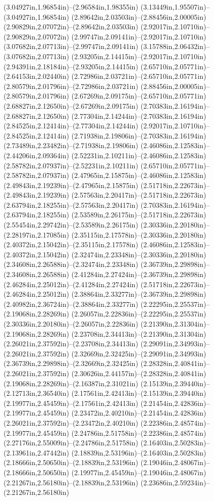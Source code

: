 (3.04927in,1.96854in)--(2.96584in,1.98355in) (3.13449in,1.95507in)--(3.04927in,1.96854in) (2.89642in,2.03503in)--(2.88456in,2.00005in) (2.90829in,2.07072in)--(2.89642in,2.03503in) (2.92017in,2.10710in)--(2.90829in,2.07072in) (2.99747in,2.09141in)--(2.92017in,2.10710in) (3.07682in,2.07713in)--(2.99747in,2.09141in) (3.15788in,2.06432in)--(3.07682in,2.07713in) (2.93205in,2.14415in)--(2.92017in,2.10710in) (2.94391in,2.18184in)--(2.93205in,2.14415in) (2.65710in,2.05771in)--(2.64153in,2.02440in) (2.72986in,2.03721in)--(2.65710in,2.05771in) (2.80579in,2.01796in)--(2.72986in,2.03721in) (2.88456in,2.00005in)--(2.80579in,2.01796in) (2.67269in,2.09175in)--(2.65710in,2.05771in) (2.68827in,2.12650in)--(2.67269in,2.09175in) (2.70383in,2.16194in)--(2.68827in,2.12650in) (2.77304in,2.14244in)--(2.70383in,2.16194in) (2.84525in,2.12414in)--(2.77304in,2.14244in) (2.92017in,2.10710in)--(2.84525in,2.12414in) (2.71938in,2.19806in)--(2.70383in,2.16194in) (2.73489in,2.23482in)--(2.71938in,2.19806in) (2.46086in,2.12583in)--(2.44206in,2.09364in) (2.52231in,2.10211in)--(2.46086in,2.12583in) (2.58782in,2.07937in)--(2.52231in,2.10211in) (2.65710in,2.05771in)--(2.58782in,2.07937in) (2.47965in,2.15875in)--(2.46086in,2.12583in) (2.49843in,2.19239in)--(2.47965in,2.15875in) (2.51718in,2.22673in)--(2.49843in,2.19239in) (2.57563in,2.20417in)--(2.51718in,2.22673in) (2.63794in,2.18255in)--(2.57563in,2.20417in) (2.70383in,2.16194in)--(2.63794in,2.18255in) (2.53589in,2.26175in)--(2.51718in,2.22673in) (2.55454in,2.29742in)--(2.53589in,2.26175in) (2.30336in,2.20180in)--(2.28197in,2.17085in) (2.35115in,2.17578in)--(2.30336in,2.20180in) (2.40372in,2.15042in)--(2.35115in,2.17578in) (2.46086in,2.12583in)--(2.40372in,2.15042in) (2.32474in,2.23348in)--(2.30336in,2.20180in) (2.34608in,2.26588in)--(2.32474in,2.23348in) (2.36739in,2.29898in)--(2.34608in,2.26588in) (2.41284in,2.27424in)--(2.36739in,2.29898in) (2.46284in,2.25012in)--(2.41284in,2.27424in) (2.51718in,2.22673in)--(2.46284in,2.25012in) (2.38864in,2.33277in)--(2.36739in,2.29898in) (2.40982in,2.36724in)--(2.38864in,2.33277in) (2.22295in,2.25537in)--(2.19068in,2.28269in) (2.26057in,2.22836in)--(2.22295in,2.25537in) (2.30336in,2.20180in)--(2.26057in,2.22836in) (2.21390in,2.31304in)--(2.19068in,2.28269in) (2.23708in,2.34413in)--(2.21390in,2.31304in) (2.26021in,2.37592in)--(2.23708in,2.34413in) (2.29091in,2.34993in)--(2.26021in,2.37592in) (2.32669in,2.32425in)--(2.29091in,2.34993in) (2.36739in,2.29898in)--(2.32669in,2.32425in) (2.28328in,2.40841in)--(2.26021in,2.37592in) (2.30626in,2.44157in)--(2.28328in,2.40841in) (2.19068in,2.28269in)--(2.16387in,2.31021in) (2.15139in,2.39440in)--(2.12713in,2.36540in) (2.17561in,2.42413in)--(2.15139in,2.39440in) (2.19977in,2.45459in)--(2.17561in,2.42413in) (2.21454in,2.42836in)--(2.19977in,2.45459in) (2.23472in,2.40210in)--(2.21454in,2.42836in) (2.26021in,2.37592in)--(2.23472in,2.40210in) (2.22386in,2.48574in)--(2.19977in,2.45459in) (2.24786in,2.51758in)--(2.22386in,2.48574in) (2.27176in,2.55009in)--(2.24786in,2.51758in) (2.16403in,2.50283in)--(2.13961in,2.47442in) (2.18839in,2.53196in)--(2.16403in,2.50283in) (2.18666in,2.50650in)--(2.18839in,2.53196in) (2.19046in,2.48067in)--(2.18666in,2.50650in) (2.19977in,2.45459in)--(2.19046in,2.48067in) (2.21267in,2.56180in)--(2.18839in,2.53196in) (2.23686in,2.59234in)--(2.21267in,2.56180in) 